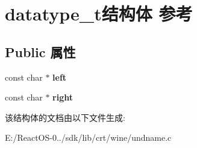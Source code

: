 \hypertarget{structdatatype__t}{}\section{datatype\+\_\+t结构体 参考}
\label{structdatatype__t}
\subsection*{Public 属性}
\begin{DoxyCompactItemize}
\item 
\mbox{\label{structdatatype__t_afb395cab158dbaf23f6ccdd77126eafc}} 
const char $\ast$ {\bfseries left}
\item 
\mbox{\label{structdatatype__t_a39e41919f2dca94eada990ac74c545da}} 
const char $\ast$ {\bfseries right}
\end{DoxyCompactItemize}


该结构体的文档由以下文件生成\+:\begin{DoxyCompactItemize}
\item 
E\+:/\+React\+O\+S-\/0../sdk/lib/crt/wine/undname.\+c\end{DoxyCompactItemize}

